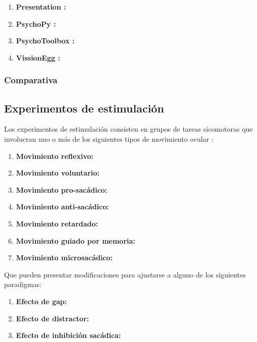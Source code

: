 \documentclass[../main.tex]{subfiles}
\begin{document}
			\begin{enumerate}
				\item \textbf{Presentation \cite{website:software_presentation}:}

				\item \textbf{PsychoPy \cite{website:software_psychopy}:}

				\item \textbf{PsychoToolbox \cite{website:software_psychotoolbox}:}

				\item \textbf{VissionEgg \cite{website:software_vissionegg}:}

			\end{enumerate}

			\subsubsection{Comparativa}
			\label{ssub:02_comparativa_software}

		\subsection{Experimentos de estimulación}
		\label{sub:02_experimentos_de_estimulacion}

		Los experimentos de estimulación consisten en grupos de tareas sicomotoras que involucran uno o más de los siguientes tipos de movimiento ocular \cite{website:movOcular}: 
		\begin{enumerate}
		 	\item \textbf{Movimiento reflexivo:}

		 	\item \textbf{Movimiento voluntario:}
		 	
		 	\item \textbf{Movimiento pro-sacádico:}
		 	
		 	\item \textbf{Movimiento anti-sacádico:}

		 	\item \textbf{Movimiento retardado:}

		 	\item \textbf{Movimiento guiado por memoria:}

		 	\item \textbf{Movimiento microsacádico:}

		 \end{enumerate} 

		 Que pueden presentar modificaciones para ajustarse a alguno de los siguientes paradigmas:
		 \begin{enumerate}
		 	\item \textbf{Efecto de gap:}

		 	\item \textbf{Efecto de distractor:}

		 	\item \textbf{Efecto de inhibición sacádica:}

		 \end{enumerate}
\end{document}
